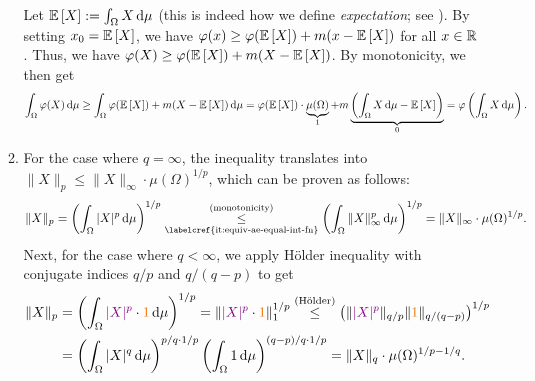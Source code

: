 \begin{enumerate}
\begin{pf}
\begin{enumerate}
\begin{center}
\end{center}

Let \(\expv{X}:=\int_{\Omega}^{}X\odif{\mu}\) (this is indeed how we define
\emph{expectation}; see ).  By setting
\(x_0=\mathbb{E}\left[X\right]\), we have \(\varphi(x)\ge \varphi(\mathbb{E}\left[X\right])+m(x-\mathbb{E}\left[X\right])\) for
all \(x\in\mathbb{R}\). Thus, we have \(\varphi(X)\ge
\varphi(\mathbb{E}\left[X\right])+m(X-\mathbb{E}\left[X\right])\). By monotonicity, we then get
\[
\int_{\Omega}^{}\varphi(X)\odif{\mu}\ge \int_{\Omega}^{}\varphi(\expv{X})
+m(X-\expv{X})\odif{\mu}
=\varphi(\expv{X})\cdot \underbrace{\mu(\Omega)}_{1}
+m\underbrace{\left(\int_{\Omega}^{}X\odif{\mu}-\expv{X}\right)}_{0}
=\varphi\left(\int_{\Omega}^{}X\odif{\mu}\right).
\]
\item For the case where \(q=\infty\), the inequality
translates into \(\|X\|_{p}\le\|X\|_{\infty}\cdot \mu(\Omega)^{1/p}\), which can
be proven as follows:
\[
\|X\|_{p}=\left(\int_{\Omega}^{}|X|^{p}\odif{\mu}\right)^{1/p}
\underset{\text{\labelcref{it:equiv-ae-equal-int-fn}}}{\overset{\text{(monotonicity)}}{\le}}
\left(\int_{\Omega}^{}\|X\|_{\infty}^{p}\odif{\mu}\right)^{1/p}
=\|X\|_{\infty}\cdot \mu(\Omega)^{1/p}.
\]
Next, for the case where \(q<\infty\), we apply H\"older inequality with
conjugate indices \(q/p\) and \(q/(q-p)\) to get
\begin{align*}
\|X\|_{p}&=\left(\int_{\Omega}^{}\vc{|X|^{p}}\cdot \orc{1}\odif{\mu}\right)^{1/p}
=\|\vc{|X|^{p}}\cdot \orc{1}\|_{1}^{1/p}
\overset{\text{(H\"older)}}{\le}
\left(\|\vc{|X|^{p}}\|_{q/p}\|\orc{1}\|_{q/(q-p)}\right)^{1/p} \\
&=\left(\int_{\Omega}^{}|X|^{q}\odif{\mu}\right)^{p/q\cdot 1/p}
\left(\int_{\Omega}^{}1\odif{\mu}\right)^{(q-p)/q\cdot 1/p}
=\|X\|_{q}\cdot \mu(\Omega)^{1/p-1/q}.
\end{align*}
\end{enumerate}
\end{pf}
\end{enumerate}
